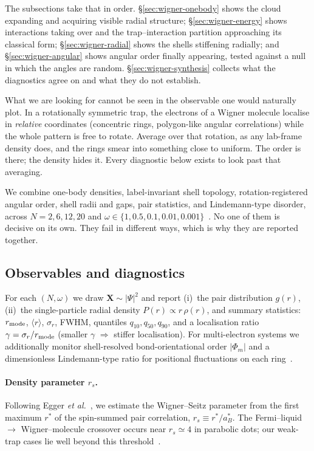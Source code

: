 The subsections take that in order. \S\ref{sec:wigner-onebody} shows the cloud expanding and
acquiring visible radial structure; \S\ref{sec:wigner-energy} shows interactions taking over
and the trap--interaction partition approaching its classical form;
\S\ref{sec:wigner-radial} shows the shells stiffening radially; and
\S\ref{sec:wigner-angular} shows angular order finally appearing, tested against a null in
which the angles are random. \S\ref{sec:wigner-synthesis} collects what the diagnostics
agree on and what they do not establish.

What we are looking for cannot be seen in the observable one would naturally plot. In a
rotationally symmetric trap, the electrons of a Wigner molecule localise in \emph{relative} coordinates (concentric rings, polygon-like angular correlations) while the whole pattern is free to rotate. Average over that rotation, as
any lab-frame density does, and the rings smear into something close to uniform. The
order is there; the density hides it. Every diagnostic below exists to look past that
averaging.

We combine one-body densities, label-invariant shell topology, rotation-registered
angular order, shell radii and gaps, pair statistics, and Lindemann-type disorder, across
$N=2,6,12,20$ and $\omega\in\{1,0.5,0.1,0.01,0.001\}$~\cite{Egger_1999,manninen2007metalclustersquantumdots}.
No one of them is decisive on its own. They fail in different ways, which is why they are
reported together.

\subsection{Observables and diagnostics}
\label{sec:wigner-diagnostics}

For each $(N,\omega)$ we draw $\mathbf X\!\sim|\Psi|^2$ and report
(i)~the pair distribution $g(r)$,
(ii)~the single-particle radial density $P(r)\!\propto\!r\,\rho(r)$,
and summary statistics: $r_{\rm mode}$, $\langle r\rangle$, $\sigma_r$, FWHM,
quantiles $q_{10},q_{50},q_{90}$, and a localisation ratio
$\gamma=\sigma_r/r_{\rm mode}$ (smaller $\gamma$ $\Rightarrow$ stiffer
localisation).
For multi-electron systems we additionally monitor shell-resolved
bond-orientational order $|\Phi_m|$ and a dimensionless Lindemann-type
ratio for positional fluctuations on each
ring~\cite{Mazars_2008}.

\paragraph{Density parameter $r_s$.}
Following Egger \textit{et al.}~\cite{Egger_1999}, we estimate the Wigner--Seitz
parameter from the first maximum $r^\ast$ of the spin-summed pair correlation,
$r_s\equiv r^\ast/a_B^\ast$.
The Fermi--liquid $\to$ Wigner--molecule crossover occurs near $r_s\!\simeq\!4$
in parabolic dots; our weak-trap cases lie well beyond this
threshold~\cite{Egger_1999,Filinov_2001}.

